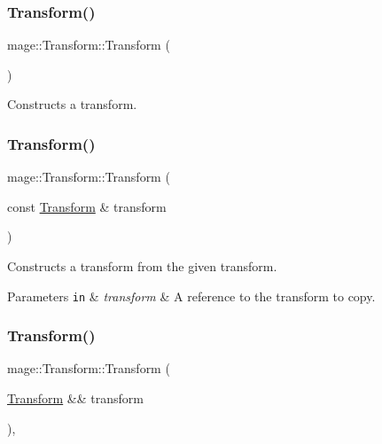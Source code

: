 \subsubsection{\texorpdfstring{Transform()}{Transform()}\hspace{0.1cm}{\footnotesize\ttfamily [1/3]}}
{\footnotesize\ttfamily mage\+::\+Transform\+::\+Transform (\begin{DoxyParamCaption}{ }\end{DoxyParamCaption})\hspace{0.3cm}{\ttfamily [noexcept]}}

Constructs a transform. \hypertarget{classmage_1_1_transform_aa26f3bb808d660ff5fccf594c0958386}{}\label{classmage_1_1_transform_aa26f3bb808d660ff5fccf594c0958386} 
\subsubsection{\texorpdfstring{Transform()}{Transform()}\hspace{0.1cm}{\footnotesize\ttfamily [2/3]}}
{\footnotesize\ttfamily mage\+::\+Transform\+::\+Transform (\begin{DoxyParamCaption}\item[{const \hyperlink{classmage_1_1_transform}{Transform} \&}]{transform }\end{DoxyParamCaption})\hspace{0.3cm}{\ttfamily [noexcept]}}

Constructs a transform from the given transform.


\begin{DoxyParams}[1]{Parameters}
\mbox{\tt in}  & {\em transform} & A reference to the transform to copy. \\
\hline
\end{DoxyParams}
\hypertarget{classmage_1_1_transform_a0d1081071df89ee1ec2640774107f66c}{}\label{classmage_1_1_transform_a0d1081071df89ee1ec2640774107f66c} 
\subsubsection{\texorpdfstring{Transform()}{Transform()}\hspace{0.1cm}{\footnotesize\ttfamily [3/3]}}
{\footnotesize\ttfamily mage\+::\+Transform\+::\+Transform (\begin{DoxyParamCaption}\item[{\hyperlink{classmage_1_1_transform}{Transform} \&\&}]{transform }\end{DoxyParamCaption})\hspace{0.3cm}{\ttfamily [default]}, {\ttfamily [noexcept]}}

